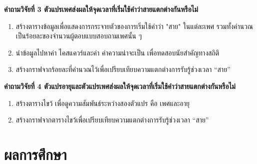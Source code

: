 \documentclass[a4paper]{article}
\begin{document}
    \textbf{คำถามวิจัยที่ 3 ตัวแปรเพศส่งผลให้จุดเวลาที่เริ่มใช้คำว่าสายแตกต่างกันหรือไม่}
    \begin{enumerate}
        \item สร้างตารางข้อมูลเพื่อแสดงการกระจายตัวของการเริ่มใช้คำว่า "สาย" ในแต่ละเพศ รวมทั้งคำนวณเป็นร้อยละของจำนวนผู้ตอบแบบสอบถามเพศนั้น ๆ
        \item นำข้อมูลไปหาค่า ไคสแควร์และค่า  ค่าความน่าจะเป็น เพื่อทดสอบนัยสำคัญทางสถิติ
        \item สร้างกราฟจากร้อยละที่คำนวณไว้เพื่อเปรียบเทียบความแตกต่างการรับรู้ช่วงเวลา “สาย”
    \end{enumerate}

    \textbf{คำถามวิจัยที่ 4 ตัวแปรอายุและตัวแปรเพศส่งผลให้จุดเวลาที่เริ่มใช้คำว่าสายแตกต่างกันหรือไม่}
    \begin{enumerate}
        \item สร้างตารางไขว้ เพื่อดูความสัมพันธ์ระหว่างสองตัวแปร คือ เพศและอายุ
        \item สร้างกราฟจากตารางไขว้เพื่อเปรียบเทียบความแตกต่างการรับรู้ช่วงเวลา “สาย”
    \end{enumerate}
\section{ผลการศึกษา}
\end{document}
